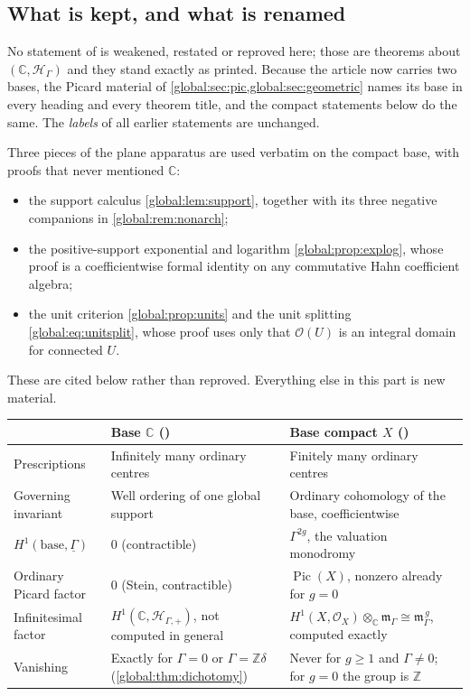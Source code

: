 \documentclass[11pt,letterpaper]{article}
\theoremstyle{definition}
\theoremstyle{remark}
\newcommand{\C}{\mathbb C}
\newcommand{\Z}{\mathbb Z}
\newcommand{\OO}{\mathcal O}
\newcommand{\HH}{\mathscr H_\Gamma}
\newcommand{\HP}{\mathscr H_{\Gamma,+}}
\newcommand{\mK}{\mathfrak m_\Gamma}
\newcommand{\Pic}{\operatorname{Pic}}
\numberwithin{equation}{section}
\begin{document}
\subsection{What is kept, and what is renamed}\label{global:sub:kept}

No statement of  is weakened, restated or reproved here; those are theorems about $(\C,\HH)$ and they stand exactly as printed. Because the article now carries two bases, the Picard material of \cref{global:sec:pic,global:sec:geometric} names its base in every heading and every theorem title, and the compact statements below do the same. The \emph{labels} of all earlier statements are unchanged.

Three pieces of the plane apparatus are used verbatim on the compact base, with proofs that never mentioned $\C$:

\begin{itemize}
\item the support calculus \cref{global:lem:support}, together with its three negative companions in \cref{global:rem:nonarch};
\item the positive-support exponential and logarithm \cref{global:prop:explog}, whose proof is a coefficientwise formal identity on any commutative Hahn coefficient algebra;
\item the unit criterion \cref{global:prop:units} and the unit splitting \eqref{global:eq:unitsplit}, whose proof uses only that $\OO(U)$ is an integral domain for connected $U$.
\end{itemize}

These are cited below rather than reproved. Everything else in this part is new material.

\begin{center}\small
\begin{tabular}{@{}L{0.22\textwidth}L{0.36\textwidth}L{0.36\textwidth}@{}}
\toprule
& Base $\C$ () & Base compact $X$ ()\\
\midrule
Prescriptions & Infinitely many ordinary centres & Finitely many ordinary centres\\[0.45em]
Governing invariant & Well ordering of one global support & Ordinary cohomology of the base, coefficientwise\\[0.45em]
$H^1(\text{base},\underline\Gamma)$ & $0$ (contractible) & $\Gamma^{2g}$, the valuation monodromy\\[0.45em]
Ordinary Picard factor & $0$ (Stein, contractible) & $\Pic(X)$, nonzero already for $g=0$\\[0.45em]
Infinitesimal factor & $H^1(\C,\HP)$, not computed in general & $H^1(X,\OO_X)\otimes_\C\mK\cong\mK^{\,g}$, computed exactly\\[0.45em]
Vanishing & Exactly for $\Gamma=0$ or $\Gamma=\Z\delta$ (\cref{global:thm:dichotomy}) & Never for $g\ge1$ and $\Gamma\ne0$; for $g=0$ the group is $\Z$\\
\bottomrule
\end{tabular}
\end{center}
\end{document}
